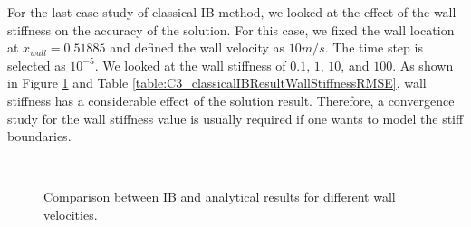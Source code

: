 For the last case study of classical IB method, we looked at the effect of the wall stiffness on the accuracy of the solution. For this case, we fixed the wall location at $x_{wall} = 0.51885$ and defined the wall velocity as $10 m/s$. The time step is selected as $10^{-5}$. We looked at the wall stiffness of $0.1$, $1$, $10$, and $100$. As shown in Figure \ref{fig:C3_classicalIBResultWallStiffness} and Table \ref{table:C3_classicalIBResultWallStiffnessRMSE}, wall stiffness has a considerable effect of the solution result. Therefore, a convergence study for the wall stiffness value is usually required if one wants to model the stiff boundaries.

\begin{figure}[H]
	\centering
	\quad
	\\
	\quad
	\caption{Comparison between IB and analytical results for different wall velocities.}
	\label{fig:C3_classicalIBResultWallStiffness}
\end{figure}

